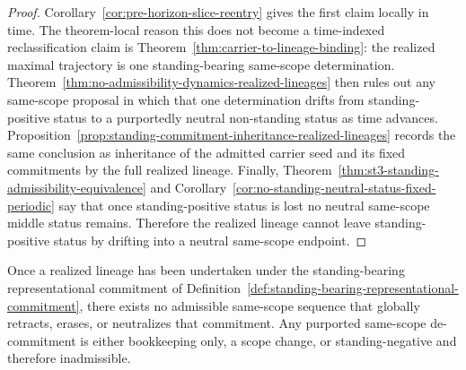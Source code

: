 \begin{proof}
Corollary~\ref{cor:pre-horizon-slice-reentry} gives the first claim locally in time. The theorem-local reason this does not become a time-indexed reclassification claim is Theorem~\ref{thm:carrier-to-lineage-binding}: the realized maximal trajectory is one standing-bearing same-scope determination. Theorem~\ref{thm:no-admissibility-dynamics-realized-lineages} then rules out any same-scope proposal in which that one determination drifts from standing-positive status to a purportedly neutral non-standing status as time advances. Proposition~\ref{prop:standing-commitment-inheritance-realized-lineages} records the same conclusion as inheritance of the admitted carrier seed and its fixed commitments by the full realized lineage. Finally, Theorem~\ref{thm:st3-standing-admissibility-equivalence} and Corollary~\ref{cor:no-standing-neutral-status-fixed-periodic} say that once standing-positive status is lost no neutral same-scope middle status remains. Therefore the realized lineage cannot leave standing-positive status by drifting into a neutral same-scope endpoint.
\end{proof}

\begin{manualproposition}
\label{prop:st5-irreversibility-representational-commitment}
Once a realized lineage has been undertaken under the standing-bearing representational commitment of Definition~\ref{def:standing-bearing-representational-commitment}, there exists no admissible same-scope sequence that globally retracts, erases, or neutralizes that commitment. Any purported same-scope de-commitment is either bookkeeping only, a scope change, or standing-negative and therefore inadmissible.
\end{manualproposition}

